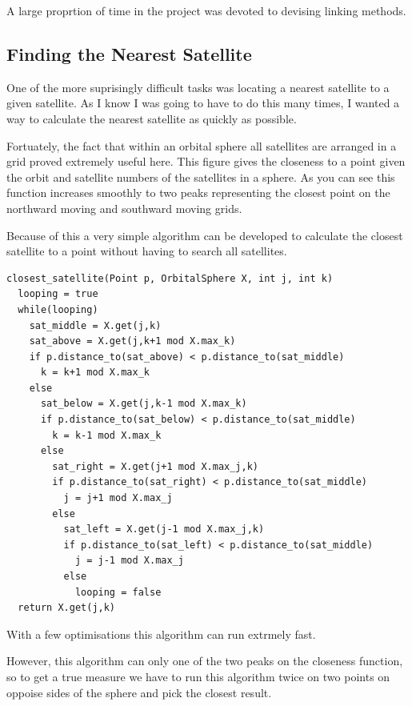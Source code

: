 \documentclass[12pt]{article}
\begin{document}
A large proprtion of time in the project was devoted to devising linking methods.


\subsection{Finding the Nearest Satellite}

One of the more suprisingly difficult tasks was locating a nearest satellite to a given satellite. As I know I was going to have to do this many times, I wanted a way to calculate the nearest satellite as quickly as possible.

Fortuately, the fact that within an orbital sphere all satellites are arranged in a grid proved extremely useful here. This figure gives the closeness to a point given the orbit and satellite numbers of the satellites in a sphere. As you can see this function increases smoothly to two peaks representing the closest point on the northward moving and southward moving grids.


Because of this a very simple algorithm can be developed to calculate the closest satellite to a point without having to search all satellites.

\begin{lstlisting}
closest_satellite(Point p, OrbitalSphere X, int j, int k)
  looping = true
  while(looping)
    sat_middle = X.get(j,k)
    sat_above = X.get(j,k+1 mod X.max_k)
    if p.distance_to(sat_above) < p.distance_to(sat_middle)
      k = k+1 mod X.max_k
    else 
      sat_below = X.get(j,k-1 mod X.max_k)
      if p.distance_to(sat_below) < p.distance_to(sat_middle)
        k = k-1 mod X.max_k
      else
        sat_right = X.get(j+1 mod X.max_j,k)
        if p.distance_to(sat_right) < p.distance_to(sat_middle)
          j = j+1 mod X.max_j
        else
          sat_left = X.get(j-1 mod X.max_j,k)
          if p.distance_to(sat_left) < p.distance_to(sat_middle)
            j = j-1 mod X.max_j
          else
            looping = false
  return X.get(j,k)
\end{lstlisting}

With a few optimisations this algorithm can run extrmely fast.

However, this algorithm can only one of the two peaks on the closeness function, so to get a true measure we have to run this algorithm twice on two points on oppoise sides of the sphere and pick the closest result.
\end{document}
